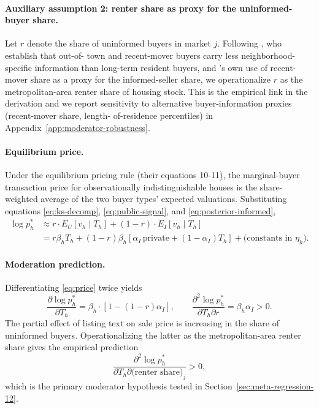 \paragraph{Auxiliary assumption 2: renter share as proxy for the
uninformed-buyer share.}
Let $r$ denote the share of uninformed buyers in market $j$.
Following \citet{chinco2016misinformed}, who establish that out-of-
town and recent-mover buyers carry less neighborhood-specific
information than long-term resident buyers, and
\citet{kurlat2015testing}'s own use of recent-mover share as a
proxy for the informed-seller share, we operationalize $r$ as the
metropolitan-area renter share of housing stock. This is the
empirical link in the derivation and we report sensitivity to
alternative buyer-information proxies (recent-mover share, length-
of-residence percentiles) in Appendix~\ref{app:moderator-robustness}.

\paragraph{Equilibrium price.} Under the
\citet{kurlat2015testing} equilibrium pricing rule (their equations
10-11), the marginal-buyer transaction price for observationally
indistinguishable houses is the share-weighted average of the two
buyer types' expected valuations.  Substituting equations
\eqref{eq:ks-decomp}, \eqref{eq:public-signal}, and
\eqref{eq:posterior-informed},
\begin{align}
\log p_h^* &\approx r \cdot E_U[v_h \mid T_h] + (1 - r) \cdot
E_I[v_h \mid T_h] \\
&= r \beta_h T_h + (1 - r) \beta_h
[\alpha_I \, \text{private} + (1 - \alpha_I) T_h]
+ \text{(constants in $\eta_h$)}.
\label{eq:price}
\end{align}

\paragraph{Moderation prediction.} Differentiating
\eqref{eq:price} twice yields
\begin{equation}
\frac{\partial \log p_h^*}{\partial T_h}
= \beta_h \cdot [1 - (1 - r) \alpha_I],
\qquad
\frac{\partial^2 \log p_h^*}{\partial T_h \partial r}
= \beta_h \alpha_I > 0.
\label{eq:moderation}
\end{equation}
The partial effect of listing text on sale price is increasing in the
share of uninformed buyers.  Operationalizing the latter as the
metropolitan-area renter share gives the empirical prediction
\begin{equation}
\frac{\partial^2 \log p_h^*}{\partial T_h \partial \text{(renter share)}_j} > 0,
\label{eq:empirical-prediction}
\end{equation}
which is the primary moderator hypothesis tested in
Section~\ref{sec:meta-regression-12}.

